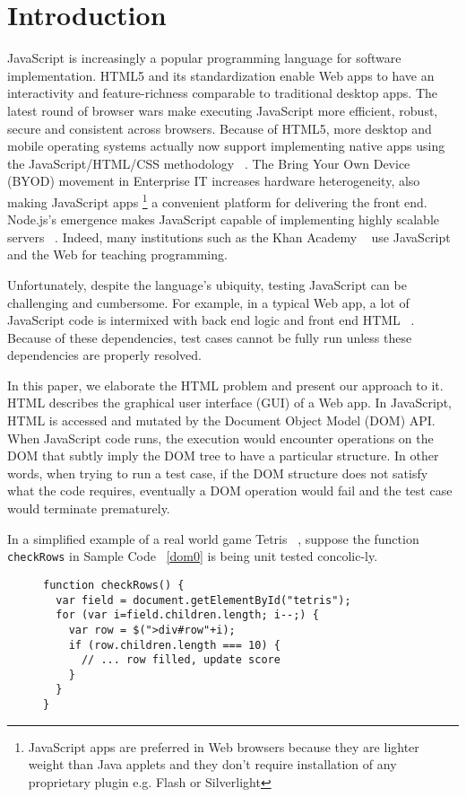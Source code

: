 \section{Introduction}

JavaScript is increasingly a popular programming language for software implementation.%
HTML5 and its standardization enable Web apps to have an interactivity and feature-richness comparable to traditional desktop apps.  The latest round of browser wars make executing JavaScript more efficient, robust, secure and consistent across browsers.  Because of HTML5, more desktop and mobile operating systems actually now support implementing native apps using the JavaScript/HTML/CSS methodology ~\cite{jalangi}.
The Bring Your Own Device (BYOD) movement in Enterprise IT increases hardware heterogeneity, also making JavaScript apps \footnote{JavaScript apps are preferred in Web browsers because they are lighter weight than Java applets and they don't require installation of any proprietary plugin e.g. Flash or Silverlight} a convenient platform for delivering the front end. %
Node.js's emergence makes JavaScript capable of implementing highly scalable servers ~\cite{nodeUpRunning}.  
Indeed, many institutions such as the Khan Academy ~\cite{khanAcademy} use JavaScript and the Web for teaching programming.

Unfortunately, despite the language's ubiquity, testing JavaScript can be challenging and cumbersome.
For example, in a typical Web app, a lot of JavaScript code is intermixed with back end logic and front end HTML ~\cite{QUnitIntro}.
Because of these dependencies, test cases cannot be fully run unless these dependencies are properly resolved.  

In this paper, we elaborate the HTML problem and present our approach to it.
HTML describes the graphical user interface (GUI) of a Web app.  In JavaScript, HTML is accessed and mutated by the Document Object Model (DOM) API.
When JavaScript code runs, the execution would encounter operations on the DOM that subtly imply the DOM tree to have a particular structure. 
In other words, when trying to run a test case, if the DOM structure does not satisfy what the code requires, eventually a DOM operation would fail and the test case would terminate prematurely.

In a simplified example of a real world game Tetris ~\cite{domtris}, suppose the function {\tt checkRows} in Sample Code ~\ref{dom0} is being unit tested concolic-ly.  
\begin{figure}
\begin{lstlisting}[caption=Example use of closures.,label=dom0]
function checkRows() {
  var field = document.getElementById("tetris");
  for (var i=field.children.length; i--;) {
    var row = $(">div#row"+i);
    if (row.children.length === 10) {
	  // ... row filled, update score
	}
  }
}
\end{lstlisting}
\end{figure}

